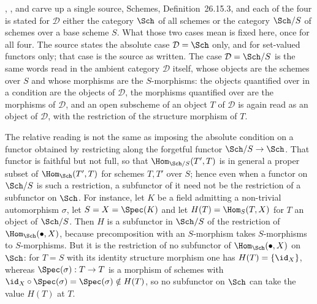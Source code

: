 \begin{definition}
\label{def:pc-absolute-relative-reading}
, ,
 and  carve up a single
source, Schemes, Definition~26.15.3, and each of the four is stated for
$\mathcal D$ either the category $\Sch$ of all schemes or the category
$\Sch/S$ of schemes over a base scheme $S$.  What those two cases mean is
fixed here, once for all four.  The source states the absolute
case $\mathcal D=\Sch$ only, and for set-valued functors only; that case is
the source as written.  The case $\mathcal D=\Sch/S$ is the same words read
in the ambient category $\mathcal D$ itself, whose objects are the schemes
over $S$ and whose morphisms are the $S$-morphisms: the objects quantified
over in a condition are the objects of $\mathcal D$, the morphisms quantified
over are the morphisms of $\mathcal D$, and an open subscheme of an object
$T$ of $\mathcal D$ is again read as an object of $\mathcal D$, with the
restriction of the structure morphism of $T$.

The relative reading is not the same as imposing the absolute condition on a
functor obtained by restricting along the forgetful functor
$\Sch/S\to\Sch$.  That functor is faithful but not full, so that
$\Hom_{\Sch/S}(T',T)$ is in general a proper subset of $\Hom_{\Sch}(T',T)$
for schemes $T,T'$ over $S$; hence even when a functor on $\Sch/S$ is such a
restriction, a subfunctor of it need not be the restriction of a subfunctor
on $\Sch$.  For instance, let $K$ be a field admitting a non-trivial
automorphism $\sigma$, let $S=X=\Spec(K)$ and let $H(T)=\Hom_S(T,X)$ for $T$
an object of $\Sch/S$.  Then $H$ is a subfunctor in $\Sch/S$ of the
restriction of $\Hom_{\Sch}(\bullet,X)$, because precomposition with an
$S$-morphism takes $S$-morphisms to $S$-morphisms.  But it is the restriction
of no subfunctor of $\Hom_{\Sch}(\bullet,X)$ on $\Sch$: for $T=S$ with its
identity structure morphism one has $H(T)=\{\id_X\}$, whereas
$\Spec(\sigma):T\to T$ is a morphism of schemes with
$\id_X\circ\Spec(\sigma)=\Spec(\sigma)\notin H(T)$, so no subfunctor on
$\Sch$ can take the value $H(T)$ at $T$.


\end{definition}
